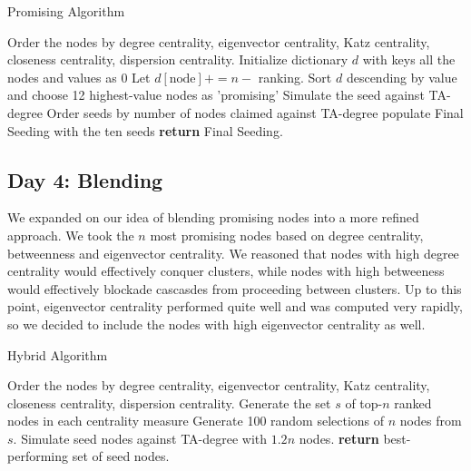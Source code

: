 \documentclass[letterpaper, 11pt]{article}
\begin{document}
\begin{algorithm}
\caption{Promising Algorithm}
\begin{algorithmic}[1]
\State Order the nodes by degree centrality, eigenvector centrality, Katz centrality, closeness centrality, dispersion centrality.
\State Initialize dictionary $d$ with keys all the nodes and values as 0
\State Let $d[\text{node}] += n - $ ranking.
\EndFor
\EndFor
\State Sort $d$ descending by value and choose 12 highest-value nodes as 'promising'
\State Simulate the seed against TA-degree
\EndFor
\State Order seeds by number of nodes claimed against TA-degree
\State populate Final Seeding with the ten seeds
\EndFor
\EndWhile
\EndProcedure
\State \textbf{return} Final Seeding.
\end{algorithmic}
\label{alg:promising}
\end{algorithm}

\subsection{Day 4: Blending}
We expanded on our idea of blending promising nodes into a more refined approach. We took the $n$ most promising nodes based on degree centrality, betweenness and eigenvector centrality. We reasoned that nodes with high degree centrality would effectively conquer clusters, while nodes with high betweeness would effectively blockade cascasdes from proceeding between clusters. Up to this point, eigenvector centrality performed quite well and was computed very rapidly, so we decided to include the nodes with high eigenvector centrality as well.


\begin{algorithm}
\caption{Hybrid Algorithm}
\begin{algorithmic}[1]
\State Order the nodes by degree centrality, eigenvector centrality, Katz centrality, closeness centrality, dispersion centrality.
\State Generate the set $s$ of top-$n$ ranked nodes in each centrality measure
\State Generate 100 random selections of $n$ nodes from $s$.
\State Simulate seed nodes against TA-degree with $1.2n$ nodes.
\EndFor
\State \textbf{return} best-performing set of seed nodes.
\EndProcedure
\end{algorithmic}
\label{alg:hybrid}
\end{algorithm}
\end{document}
